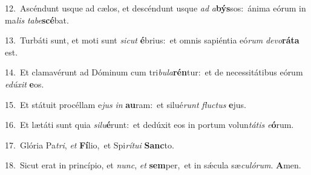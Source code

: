 {\numbfont\textcolor{\numbcolor}{12.}}~Ascéndunt usque ad cælos, et descéndunt usque \textit{ad} \textit{a}\-\textbf{býs}sos:~\star ánima eórum in ma\textit{lis} \textit{ta}\-\textit{be}\textbf{scé}bat.\par
{\numbfont\textcolor{\numbcolor}{13.}}~Turbáti sunt, et moti sunt \textit{sic}\-\textit{ut} \textbf{é}\-brius:~\star et omnis sapiéntia eó\textit{rum} \textit{de}\-\textit{vo}\textbf{rá}\textbf{ta} est.\par
{\numbfont\textcolor{\numbcolor}{14.}}~Et clamavérunt ad Dóminum cum tri\-\textit{bu}\-\textit{la}\textbf{rén}tur:~\star et de necessitátibus eórum \textit{e}\-\textit{dú}\textit{xit} \textbf{e}\-os.\par
{\numbfont\textcolor{\numbcolor}{15.}}~Et státuit procéllam e\textit{jus} \textit{in} \textbf{au}\-ram:~\star et silué\textit{runt} \textit{fluc}\-\textit{tus} \textbf{e}\-jus.\par
{\numbfont\textcolor{\numbcolor}{16.}}~Et lætáti sunt quia \textit{si}\-\textit{lu}\textbf{é}runt:~\star et dedúxit eos in portum volun\-\textit{tá}\-\textit{tis} \textit{e}\-\textbf{ó}rum.\par
{\numbfont\textcolor{\numbcolor}{17.}}~Glória Pa\-\textit{tri}\-, \textit{et} \textbf{Fí}\-lio,~\star et Spi\-\textit{rí}\-\textit{tu}\textit{i} \textbf{Sanc}\-to.\par
{\numbfont\textcolor{\numbcolor}{18.}}~Sicut erat in princípio, et \textit{nunc}\-, \textit{et} \textbf{sem}\-per,~\star et in sǽcula sæ\-\textit{cu}\-\textit{ló}\textit{rum}. \textbf{A}\-men.\par
